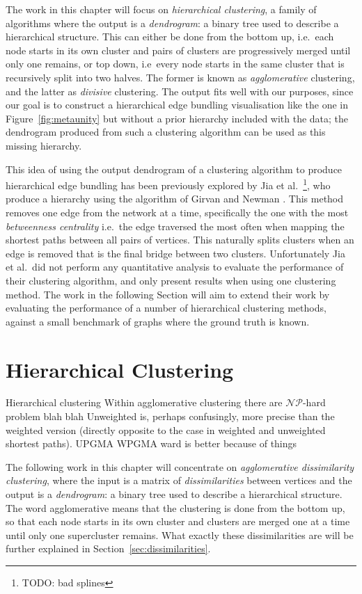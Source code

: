 The work in this chapter will focus on \emph{hierarchical clustering}, a family of algorithms where the output is a  \textit{dendrogram}: a binary tree used to describe a hierarchical structure.
This can either be done from the bottom up, i.e.\ each node starts in its own cluster and pairs of clusters are progressively merged until only one remains, or top down, i.e\ every node starts in the same cluster that is recursively split into two halves. The former is known as \emph{agglomerative} clustering, and the latter as \emph{divisive} clustering.
The output fits well with our purposes, since our goal is to construct a hierarchical edge bundling visualisation like the one in Figure~\ref{fig:metaunity} but without a prior hierarchy included with the data; the dendrogram produced from such a clustering algorithm can be used as this missing hierarchy.

This idea of using the output dendrogram of a clustering algorithm to produce hierarchical edge bundling has been previously explored by Jia et al.~\cite{Jia2011}\footnote{TODO: bad splines}, who produce a hierarchy using the algorithm of Girvan and Newman \cite{Newman2004}. This method removes one edge from the network at a time, specifically the one with the most \emph{betweenness centrality} i.e.\ the edge traversed the most often when mapping the shortest paths between all pairs of vertices. This naturally splits clusters when an edge is removed that is the final bridge between two clusters.
Unfortunately Jia et al.\ did not perform any quantitative analysis to evaluate the performance of their clustering algorithm, and only present results when using one clustering method. The work in the following Section will aim to extend their work by evaluating the performance of a number of hierarchical clustering methods, against a small benchmark of graphs where the ground truth is known.

\section{Hierarchical Clustering}
\label{sec:hierarchicalclustering}
Hierarchical clustering 
Within agglomerative clustering there are 
$\mathcal{NP}$-hard problem blah blah
Unweighted is, perhaps confusingly, more precise than the weighted version (directly opposite to the case in weighted and unweighted shortest paths). 
UPGMA WPGMA ward is better because of things

The following work in this chapter will concentrate on \textit{agglomerative dissimilarity clustering}, where the input is a matrix of \emph{dissimilarities} between vertices and the output is a \textit{dendrogram}: a binary tree used to describe a hierarchical structure. The word agglomerative means that the clustering is done from the bottom up, so that each node starts in its own cluster and clusters are merged one at a time until only one supercluster remains.
What exactly these dissimilarities are will be further explained in Section~\ref{sec:dissimilarities}.

